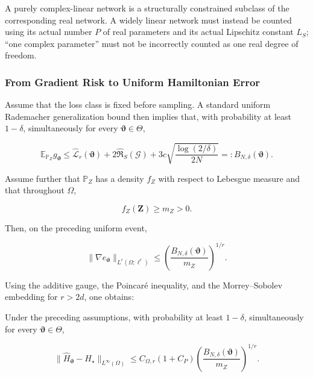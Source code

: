A purely complex-linear network is a structurally constrained subclass of the corresponding real network. A widely linear network must instead be counted using its actual number \(P\) of real parameters and its actual Lipschitz constant \(L_{S}\); ``one complex parameter'' must not be incorrectly counted as one real degree of freedom.

\subsubsection{From Gradient Risk to Uniform Hamiltonian Error}\label{sec:chnn-4-6-4}

Assume that the loss class is fixed before sampling. A standard uniform Rademacher generalization bound then implies that, with probability at least \(1-\delta\), simultaneously for every \(\bm{\vartheta}\in\Theta\),

\begin{equation}
\label{eq:chnn-4-46}
\mathbb{E}_{\mathbb{P}_{Z}}g_{\bm{\vartheta}} \leq {\widehat{\mathcal{L}}}_{r}\left( \bm{\vartheta} \right) + 2{\widehat{\mathfrak{R}}}_{S}\left( \mathcal{G} \right) + 3c\sqrt{\frac{\log(2/\delta)}{2N}} = :B_{N,\delta}\left( \bm{\vartheta} \right).
\end{equation}

Assume further that \(\mathbb{P}_{Z}\) has a density \(f_{Z}\) with respect to Lebesgue measure and that throughout \(\Omega\),

\begin{equation}
\label{eq:chnn-4-47}
f_{Z}\left( \mathbf{Z} \right) \geq m_{Z} > 0.
\end{equation}

Then, on the preceding uniform event,

\begin{equation}
\label{eq:chnn-4-48}
\left. \parallel\nabla e_{\bm{\vartheta}} \right.\parallel_{L^{r}\left( \Omega;\ell^{r} \right)} \leq \left( \frac{B_{N,\delta}\left( \bm{\vartheta} \right)}{m_{Z}} \right)^{1/r}.
\end{equation}

Using the additive gauge, the Poincaré inequality, and the Morrey--Sobolev embedding for \(r>2d\),\cite{AdamsFournier2003SobolevSpaces} one obtains:

\begin{theorem}\label{thm:hamiltonian-uniform-generalization}
Under the preceding assumptions, with probability at least \(1-\delta\), simultaneously for every \(\bm{\vartheta}\in\Theta\),

\begin{equation}
\label{eq:chnn-4-49}
\boxed{\left. \parallel{\widehat{H}}_{\bm{\vartheta}} - H_{\star} \right.\parallel_{L^{\infty}(\Omega)} \leq C_{\Omega,r}\left( 1 + C_{P} \right)\left( \frac{B_{N,\delta}\left( \bm{\vartheta} \right)}{m_{Z}} \right)^{1/r}.}
\end{equation}
\end{theorem}

